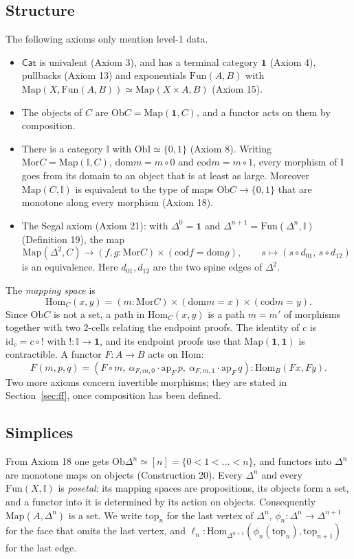 \documentclass[11pt]{amsart}
\numberwithin{equation}{section}
\theoremstyle{definition}
\theoremstyle{remark}
\newcommand{\Cat}{\mathsf{Cat}}
\newcommand{\Map}{\mathrm{Map}}
\newcommand{\Fun}{\mathrm{Fun}}
\newcommand{\Ob}{\mathrm{Ob}}
\newcommand{\Mor}{\mathrm{Mor}}
\newcommand{\Hom}{\mathrm{Hom}}
\newcommand{\dom}{\mathrm{dom}}
\newcommand{\cod}{\mathrm{cod}}
\newcommand{\id}{\mathrm{id}}
\newcommand{\II}{\mathbb{I}}
\newcommand{\one}{\mathbf{1}}
\begin{document}
\subsection{Structure}
The following axioms only mention level-1 data.
\begin{itemize}
\item $\Cat$ is univalent (Axiom 3), and has a terminal category $\one$
  (Axiom 4), pullbacks (Axiom 13) and exponentials $\Fun(A,B)$ with
  $\Map(X,\Fun(A,B))\simeq\Map(X\times A,B)$ (Axiom 15).
\item The objects of $C$ are $\Ob C=\Map(\one,C)$, and a functor acts on
  them by composition.
\item There is a category $\II$ with $\Ob\II\simeq\{0,1\}$ (Axiom 8).
  Writing $\Mor C=\Map(\II,C)$, $\dom m=m\circ 0$ and $\cod m=m\circ 1$,
  every morphism of $\II$ goes from its domain to an object that is at
  least as large. Moreover $\Map(C,\II)$ is equivalent to the type of
  maps $\Ob C\to\{0,1\}$ that are monotone along every morphism
  (Axiom 18).
\item The Segal axiom (Axiom 21): with $\Delta^0=\one$ and
  $\Delta^{n+1}=\Fun(\Delta^n,\II)$ (Definition 19), the map
  \[
  \Map(\Delta^2,C)\to(f,g:\Mor C)\times(\cod f=\dom g),\qquad
  s\mapsto(s\circ d_{01},\,s\circ d_{12})
  \]
  is an equivalence. Here $d_{01},d_{12}$ are the two spine edges of
  $\Delta^2$.
\end{itemize}
The \emph{mapping space} is
\[
\Hom_C(x,y)=(m:\Mor C)\times(\dom m=x)\times(\cod m=y).
\]
Since $\Ob C$ is not a set, a path in $\Hom_C(x,y)$ is a path $m=m'$ of
morphisms together with two 2-cells relating the endpoint proofs. The
identity of $c$ is $\id_c=c\circ{!}$ with ${!}:\II\to\one$, and its
endpoint proofs use that $\Map(\one,\one)$ is contractible. A functor
$F:A\to B$ acts on $\Hom$:
\[
F(m,p,q)=(F\circ m,\ \alpha_{F,m,0}\cdot \mathrm{ap}_F\,p,\
\alpha_{F,m,1}\cdot\mathrm{ap}_F\,q):\Hom_B(Fx,Fy).
\]
Two more axioms concern invertible morphisms; they are stated in
Section~\ref{sec:ff}, once composition has been defined.

\subsection{Simplices}
From Axiom 18 one gets $\Ob\Delta^n\simeq[n]=\{0<1<\dots<n\}$, and
functors into $\Delta^n$ are monotone maps on objects (Construction 20).
Every $\Delta^n$ and every $\Fun(X,\II)$ is \emph{posetal}: its mapping
spaces are propositions, its objects form a set, and a functor into it
is determined by its action on objects. Consequently $\Map(A,\Delta^n)$
is a set. We write $\mathrm{top}_n$ for the last vertex of $\Delta^n$,
$\phi_n:\Delta^n\to\Delta^{n+1}$ for the face that omits the last
vertex, and $\ell_n:\Hom_{\Delta^{n+1}}(\phi_n(\mathrm{top}_n),
\mathrm{top}_{n+1})$ for the last edge.
\end{document}
